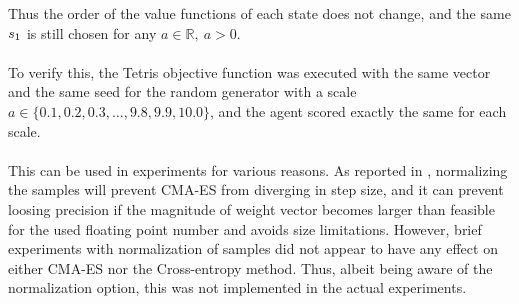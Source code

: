 Thus the order of the value functions of 
each state does not change, and the same $s_1$
is still chosen for any $a \in \mathbb{R}, \ a > 0$.\\
\\
To verify this, the Tetris objective function was executed with the
same vector and the same seed for the random generator with a scale
$a \in \{0.1, 0.2,0.3, \dots, 9.8,9.9,10.0\}$, and the agent scored 
exactly the same for each scale.\\
\\
This can be used in experiments for various reasons. As reported 
in \citep{boumaza2009}, normalizing the samples will 
prevent CMA-ES from diverging in step size,
and it can prevent loosing precision if the magnitude of weight 
vector becomes larger than feasible for the used floating 
point number and avoids size limitations. However, brief experiments 
with normalization of samples did not appear to have any effect 
on either CMA-ES nor the Cross-entropy method. Thus, albeit 
being aware of the normalization option, this was not implemented
in the actual experiments.




